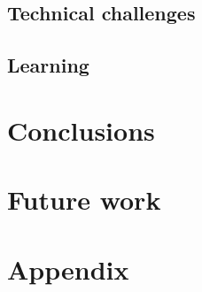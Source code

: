 \documentclass[11pt]{article}
\begin{document}
\subsection{Technical challenges}

\subsection{Learning}



\section{Conclusions}


\section{Future work}

\section{Appendix}

\end{document}
